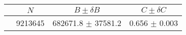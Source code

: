 \begin{tabular}{lccc}
\hline
    &   $N$   & $B \pm \delta B$  &  $C \pm \delta C$ \\
\hline
                               & 9213645    & 682671.8   $\pm$ 37581.2 & 0.656      $\pm$ 0.003 \\
\hline
\end{tabular}
